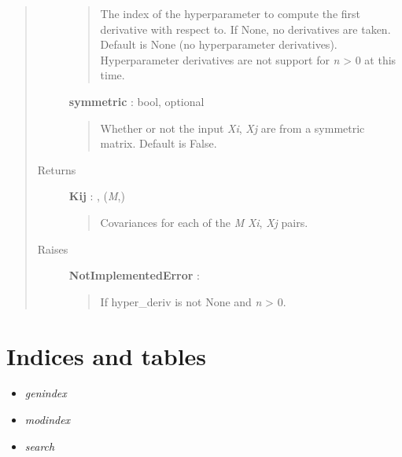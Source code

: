 \documentclass[letterpaper,10pt,english]{sphinxmanual}
\begin{document}
\begin{fulllineitems}
\begin{fulllineitems}
\begin{quote}
\begin{description}
\begin{quote}
The index of the hyperparameter to compute the first derivative
with respect to. If None, no derivatives are taken. Default is None
(no hyperparameter derivatives). Hyperparameter derivatives are not
support for \emph{n} \textgreater{} 0 at this time.
\end{quote}

\textbf{symmetric} : bool, optional
\begin{quote}

Whether or not the input \emph{Xi}, \emph{Xj} are from a symmetric matrix.
Default is False.
\end{quote}

\item[{Returns }] \leavevmode
\textbf{Kij} : , (\emph{M},)
\begin{quote}

Covariances for each of the \emph{M} \emph{Xi}, \emph{Xj} pairs.
\end{quote}

\item[{Raises }] \leavevmode
\textbf{NotImplementedError} :
\begin{quote}

If hyper\_deriv is not None and \emph{n} \textgreater{} 0.
\end{quote}

\end{description}\end{quote}

\end{fulllineitems}


\end{fulllineitems}



\chapter{Indices and tables}
\label{index:indices-and-tables}\begin{itemize}
\item {} 
\emph{genindex}

\item {} 
\emph{modindex}

\item {} 
\emph{search}

\end{itemize}
\end{document}
